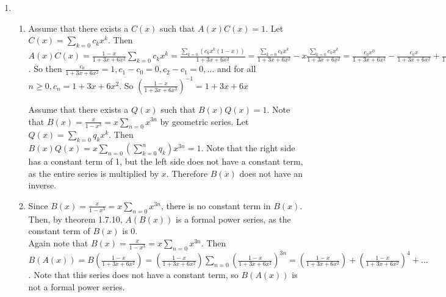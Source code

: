 \documentclass[10pt,english]{article}
\begin{document}
\begin{enumerate}
\begin{enumerate}
\item Note that a generating series for compositions of size $n>2$ is $x^2+x^3+x^4+\ldots=x^2\sum_{n\geq0}x^n$. By product lemma, the generating series for all compositions of size $k$ is equal to $\left(x^2\cdot\sum_{n\geq0}x^n\right)^k=\left(\frac{x^2}{1-x}\right)^k$. Then to find all the compositions of all sizes $k$ we get $\Phi_S(x)=\sum_{k\geq0}\left(\frac{x^2}{1-x}\right)^k=\frac{1}{1-\frac{x^2}{1-x}}=\frac{1-x}{1-x-x^2}$. Then $[x^n](1-x-x^2)\Phi_S(x)=[x^n](1-x-x^2)\frac{1-x}{1-x-x^2}=[x^n]1-x$. So obviously the coefficient of $x^n$ is 1 when $n=0$, $-1$ when $n=1$, and 0 otherwise. 

\end{enumerate}


\pagebreak
\item \begin{enumerate}
    \item Assume that there exists a $C(x)$ such that $A(x)C(x)=1$. Let $C(x)=\sum_{k=0}c_kx^k$. Then $A(x)C(x)=\frac{1-x}{1+3x+6x^2}\sum_{k=0}c_kx^k=\frac{\sum_{k=0}(c_kx^k(1-x))}{1+3x+6x^2}=\frac{\sum_{k=0}c_kx^k}{1+3x+6x^2}-x\frac{\sum_{k=0}c_kx^k}{1+3x+6x^2}=\frac{c_0x^0}{1+3x+6x^2}-\frac{c_0x}{1+3x+6x^2}+\frac{c_1x}{1+3x+6x^2}-\frac{c_1x^2}{1+3x+6x^2}+\ldots=\frac{c_0x^0}{1+3x+6x^2}+\frac{x}{1+3x+6x^2}(c_1-c_0)+\frac{x^2}{1+3x+6x^2}(c_2-c_1)+\ldots$. So then $\frac{c_0}{1+3x+6x^2}=1,c_1-c_0=0,c_2-c_1=0,\ldots$ and for all $n\geq0,c_n=1+3x+6x^2$. So $\left(\frac{1-x}{1+3x+6x^2}\right)^{-1}=1+3x+6x$
    
    Assume that there exists a $Q(x)$ such that $B(x)Q(x)=1$. Note that $B(x)=\frac{x}{1-x^3}=x\sum_{n=0}x^{3n}$ by geometric series. Let $Q(x)=\sum_{k=0}q_kx^k$. Then $B(x)Q(x)=x\sum_{n=0}\left(\sum_{k=0}^nq_k\right)x^{3n}=1$. Note that the right side has a constant term of 1, but the left side does not have a constant term, as the entire series is multiplied by $x$. Therefore $B(x)$ does not have an inverse. 
    
    \item Since $B(x)=\frac{x}{1-x^3}=x\sum_{n=0}x^{3n}$, there is no constant term in $B(x)$. Then, by theorem 1.7.10, $A(B(x))$ is a formal power series, as the constant term of $B(x)$ is 0.
    \\

Again note that $B(x)=\frac{x}{1-x^3}=x\sum_{n=0}x^{3n}$. Then $B(A(x))=B\left(\frac{1-x}{1+3x+6x^2}\right)=\left(\frac{1-x}{1+3x+6x^2}\right)\sum_{n=0}\left(\frac{1-x}{1+3x+6x^2}\right)^{3n}=\left(\frac{1-x}{1+3x+6x^2}\right)+\left(\frac{1-x}{1+3x+6x^2}\right)^4+\ldots$. Note that this series does not have a constant term, so $B(A(x))$ is not a formal power series. 
    
    
\end{enumerate}
\end{enumerate}
\end{document}
